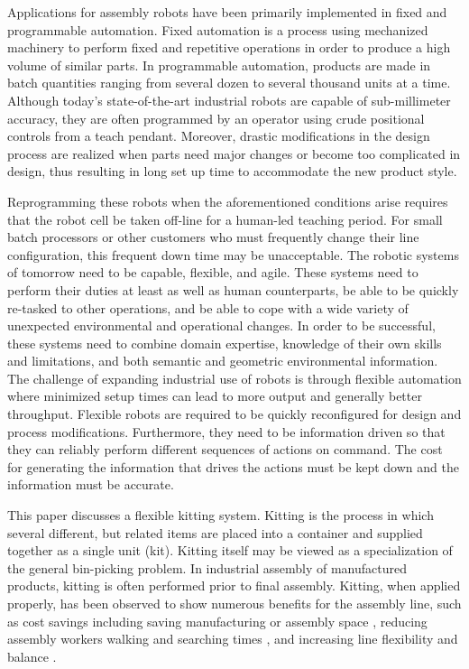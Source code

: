 Applications for assembly robots have been primarily implemented in fixed
and programmable automation. Fixed automation is a process using mechanized
machinery to perform fixed and repetitive operations in order to produce a
high volume of similar parts. In programmable automation, products are made
in batch quantities ranging from several dozen to several thousand units at
a time. Although today's state-of-the-art industrial robots are capable of
sub-millimeter accuracy, they are often programmed by
an operator using crude positional controls from a teach pendant. Moreover,
drastic modifications in the design process are realized when parts need
major changes or become too complicated in design, thus resulting in long
set up time to accommodate the new product style.

Reprogramming these robots when the aforementioned conditions arise
requires that the robot cell be taken off-line for a human-led teaching
period. For small batch processors or other customers who must frequently
change their line configuration, this frequent down time may be
unacceptable. The robotic systems of tomorrow need to be capable, flexible,
and agile. These systems need to perform their duties at least as well as
human counterparts, be able to be quickly re-tasked to other operations,
and be able to cope with a wide variety of unexpected environmental and
operational changes. In order to be successful, these systems need to
combine domain expertise, knowledge of their own skills and limitations,
and both semantic and geometric environmental information. The challenge of
expanding industrial use of robots is through flexible automation where
minimized setup times can lead to more output and generally better
throughput. Flexible robots are required to be quickly reconfigured for
design and process modifications. Furthermore, they need to be information
driven so that they can reliably perform different sequences of actions on
command. The cost for generating the information that drives the actions
must be kept down and the information must be accurate.

This paper discusses a flexible kitting system. Kitting is the process in
which several different, but related items are placed into a container and
supplied together as a single unit (kit). Kitting itself may be viewed as a
specialization of the general bin-picking problem. In industrial assembly
of manufactured products, kitting is often performed prior to final
assembly. Kitting, when applied properly, has been observed to show
numerous benefits for the assembly line, such as cost
savings \cite{Carlsson_2008} including saving manufacturing or assembly
space \cite{Medbo2003}, reducing assembly workers walking and searching
times \cite{Schwind1992}, and increasing line flexibility \cite{Bozer1992}
and balance \cite{Jiao2000}.

